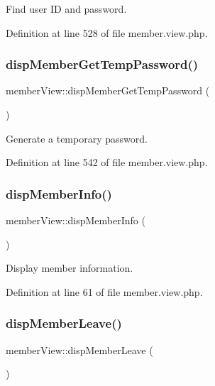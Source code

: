 Find user ID and password. 



Definition at line 528 of file member.\+view.\+php.

\mbox{\label{classmemberView_a60b995873557682a5019b8676ce65275}} 
\subsubsection{\texorpdfstring{disp\+Member\+Get\+Temp\+Password()}{dispMemberGetTempPassword()}}
{\footnotesize\ttfamily member\+View\+::disp\+Member\+Get\+Temp\+Password (\begin{DoxyParamCaption}{ }\end{DoxyParamCaption})}



Generate a temporary password. 



Definition at line 542 of file member.\+view.\+php.

\mbox{\label{classmemberView_a81e424307992bdf56ca588e8d1a84995}} 
\subsubsection{\texorpdfstring{disp\+Member\+Info()}{dispMemberInfo()}}
{\footnotesize\ttfamily member\+View\+::disp\+Member\+Info (\begin{DoxyParamCaption}{ }\end{DoxyParamCaption})}



Display member information. 



Definition at line 61 of file member.\+view.\+php.

\mbox{\label{classmemberView_a804df0ce30b1cad33f15c8a34df46929}} 
\subsubsection{\texorpdfstring{disp\+Member\+Leave()}{dispMemberLeave()}}
{\footnotesize\ttfamily member\+View\+::disp\+Member\+Leave (\begin{DoxyParamCaption}{ }\end{DoxyParamCaption})}



